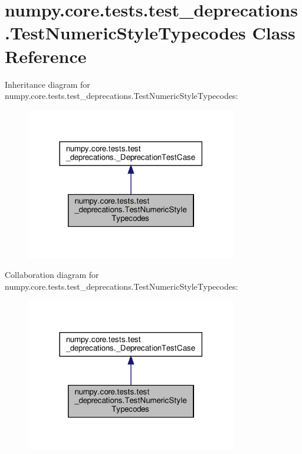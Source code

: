 \hypertarget{classnumpy_1_1core_1_1tests_1_1test__deprecations_1_1TestNumericStyleTypecodes}{}\section{numpy.\+core.\+tests.\+test\+\_\+deprecations.\+Test\+Numeric\+Style\+Typecodes Class Reference}
\label{classnumpy_1_1core_1_1tests_1_1test__deprecations_1_1TestNumericStyleTypecodes}


Inheritance diagram for numpy.\+core.\+tests.\+test\+\_\+deprecations.\+Test\+Numeric\+Style\+Typecodes\+:
\nopagebreak
\begin{figure}[H]
\begin{center}
\leavevmode
\includegraphics[width=261pt]{classnumpy_1_1core_1_1tests_1_1test__deprecations_1_1TestNumericStyleTypecodes__inherit__graph}
\end{center}
\end{figure}


Collaboration diagram for numpy.\+core.\+tests.\+test\+\_\+deprecations.\+Test\+Numeric\+Style\+Typecodes\+:
\nopagebreak
\begin{figure}[H]
\begin{center}
\leavevmode
\includegraphics[width=261pt]{classnumpy_1_1core_1_1tests_1_1test__deprecations_1_1TestNumericStyleTypecodes__coll__graph}
\end{center}
\end{figure}
